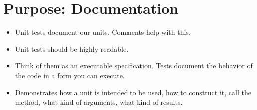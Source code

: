 \documentclass{article}
\begin{document}
\sloppy
\section{Purpose: Documentation}
\begin{itemize}
    \item Unit tests document our units. Comments help with this.
    \item Unit tests should be highly readable.
    \item Think of them as an executable specification. Tests document the
        behavior of the code in a form you can execute.
    \item Demonstrates how a unit is intended to be used, how to construct
        it, call the method, what kind of arguments, what kind of results.
\end{itemize}
\end{document}
